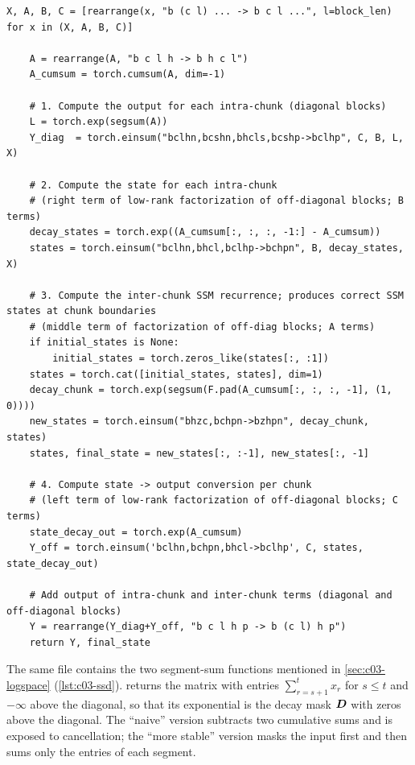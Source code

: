 \begin{lstlisting}[caption={Excerpt from \texttt{repos/\allowbreak state-spaces\_\_mamba/\allowbreak mamba\_ssm/\allowbreak modules/\allowbreak ssd\_minimal.py} (function \texttt{ssd\_minimal\_discrete}): the four steps of the chunkwise SSD algorithm.},label={lst:c03-ssd-chunks}]
    X, A, B, C = [rearrange(x, "b (c l) ... -> b c l ...", l=block_len) for x in (X, A, B, C)]

    A = rearrange(A, "b c l h -> b h c l")
    A_cumsum = torch.cumsum(A, dim=-1)

    # 1. Compute the output for each intra-chunk (diagonal blocks)
    L = torch.exp(segsum(A))
    Y_diag  = torch.einsum("bclhn,bcshn,bhcls,bcshp->bclhp", C, B, L, X)

    # 2. Compute the state for each intra-chunk
    # (right term of low-rank factorization of off-diagonal blocks; B terms)
    decay_states = torch.exp((A_cumsum[:, :, :, -1:] - A_cumsum))
    states = torch.einsum("bclhn,bhcl,bclhp->bchpn", B, decay_states, X)

    # 3. Compute the inter-chunk SSM recurrence; produces correct SSM states at chunk boundaries
    # (middle term of factorization of off-diag blocks; A terms)
    if initial_states is None:
        initial_states = torch.zeros_like(states[:, :1])
    states = torch.cat([initial_states, states], dim=1)
    decay_chunk = torch.exp(segsum(F.pad(A_cumsum[:, :, :, -1], (1, 0))))
    new_states = torch.einsum("bhzc,bchpn->bzhpn", decay_chunk, states)
    states, final_state = new_states[:, :-1], new_states[:, -1]

    # 4. Compute state -> output conversion per chunk
    # (left term of low-rank factorization of off-diagonal blocks; C terms)
    state_decay_out = torch.exp(A_cumsum)
    Y_off = torch.einsum('bclhn,bchpn,bhcl->bclhp', C, states, state_decay_out)

    # Add output of intra-chunk and inter-chunk terms (diagonal and off-diagonal blocks)
    Y = rearrange(Y_diag+Y_off, "b c l h p -> b (c l) h p")
    return Y, final_state
\end{lstlisting}

The same file contains the two segment-sum functions mentioned in \cref{sec:c03-logspace}
(\cref{lst:c03-ssd}).  returns the matrix with entries
$\sum_{r=s+1}^{t}x_r$ for $s\le t$ and $-\infty$ above the diagonal, so that its exponential is
the decay mask $\bm{D}$ with zeros above the diagonal. The ``naive'' version subtracts two
cumulative sums and is exposed to cancellation; the ``more stable'' version masks the input
first and then sums only the entries of each segment.

